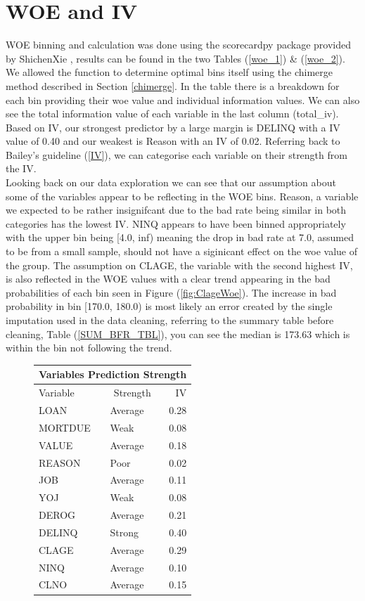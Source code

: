 \section{WOE and IV}

WOE binning and calculation was done using the scorecardpy package provided by ShichenXie \parencite{scorecardpy},  results can be found in the two Tables (\ref{woe_1}) \& (\ref{woe_2}). We allowed the function to determine optimal bins itself using the chimerge method described in Section \ref{chimerge}. In the table there is a breakdown for each bin providing their woe value and individual information values. We can also see the total information value of each variable in the last column (total\_iv). Based on IV, our strongest predictor by a large margin is DELINQ with a IV value of 0.40 and our weakest is Reason with an IV of 0.02. Referring back to Bailey's guideline (\ref{IV})\parencite{bailey2004credit}, we can categorise each variable on their strength from the IV.\\

Looking back on our data exploration we can see that our assumption about some of the variables appear to be reflecting in the WOE bins. Reason, a variable we expected to be rather insignifcant due to the bad rate being similar in both categories has the lowest IV. NINQ appears to have been binned appropriately with the upper bin being [4.0, inf) meaning the drop in bad rate at 7.0, assumed to be from a small sample, should not have a siginicant effect on the woe value of the group. The assumption on CLAGE, the variable with the second highest IV, is also reflected in the WOE values with a clear trend appearing in the bad probabilities of each bin seen in Figure (\ref{fig:ClageWoe}). The increase in bad probability in bin [170.0, 180.0) is most likely an error created by the single imputation used in the data cleaning, referring to the summary table before cleaning, Table (\ref{SUM_BFR_TBL}), you can see the median is 173.63 which is within the bin not following the trend.

\begin{figure}[ht]\label{Table2}
	\centering
	\renewcommand{\arraystretch}{1.25}
	\begin{tabular}{llr}
	\multicolumn{3}{c}{Variables Prediction Strength}\\
	\hline
	Variable & \multicolumn{1}{c}{Strength} & IV\\ 
	\hline
	LOAN & Average & 0.28\\
	MORTDUE & Weak & 0.08\\
	VALUE & Average & 0.18\\
	REASON & Poor & 0.02\\
	JOB & Average & 0.11\\
	YOJ & Weak & 0.08\\
	DEROG & Average & 0.21\\
	DELINQ & Strong & 0.40\\
	CLAGE & Average & 0.29\\
	NINQ & Average & 0.10\\
	CLNO & Average & 0.15\\
	\bottomrule
	\end{tabular}
\end{figure}

